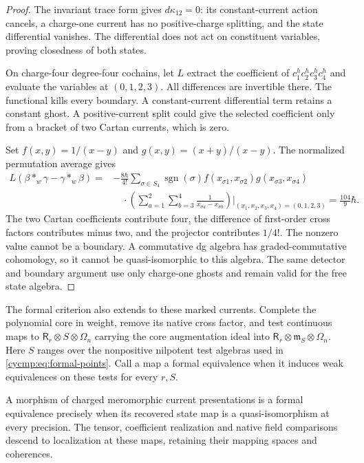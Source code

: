 \begin{proof}
The invariant trace form gives $d\kappa_{12}=0$: its
constant-current action cancels, a charge-one current has no
positive-charge splitting, and the state differential vanishes.
The differential does not act on constituent variables, proving
closedness of both states.

On charge-four degree-four cochains, let $L$ extract the coefficient
of $c_1^hc_2^hc_3^hc_4^h$ and evaluate the variables at $(0,1,2,3)$.
All differences are invertible there. The functional kills every
boundary. A constant-current differential term retains a constant
ghost. A positive-current split could give the selected coefficient
only from a bracket of two Cartan currents, which is zero.

Set $f(x,y)=1/(x-y)$ and $g(x,y)=(x+y)/(x-y)$. The normalized
permutation average gives
\begin{equation}\label{cycmp:eq:cohomology-detector}
 \begin{split}
 L(\beta*_w\gamma-\gamma*_w\beta)
 ={}&-\frac{8\hbar}{4!}\sum_{\sigma\in S_4}\operatorname{sgn}(\sigma)
 f(x_{\sigma1},x_{\sigma2})g(x_{\sigma3},x_{\sigma4})\\
 &\quad\cdot\left(\sum_{a=1}^2\sum_{b=3}^4
              \frac1{x_{\sigma a}-x_{\sigma b}}\right)
          \bigg|_{(x_1,x_2,x_3,x_4)=(0,1,2,3)}
 =\frac{104}{9}\hbar.
 \end{split}
\end{equation}
The two Cartan coefficients contribute four, the difference of
first-order cross factors contributes minus two, and the projector
contributes $1/4!$. The nonzero value cannot be a boundary.
A commutative dg algebra has graded-commutative cohomology, so it
cannot be quasi-isomorphic to this algebra. The same detector and
boundary argument use only charge-one ghosts and remain valid for
the free state algebra.
\end{proof}

The formal criterion also extends to these marked currents. Complete
the polynomial core in weight, remove its native cross factor, and
test continuous maps to
$\mathsf R_r\otimes S\otimes\Omega_n$ carrying the core augmentation
ideal into $\mathsf R_r\otimes\mathfrak m_S\otimes\Omega_n$.
Here $S$ ranges over the nonpositive nilpotent test algebras used
in \eqref{cycmp:eq:formal-points}. Call a map a formal equivalence
when it induces weak equivalences on these tests for every $r,S$.

\begin{corollary}\label{cycmp:cor:interacting-formal}
A morphism of charged meromorphic current presentations is a formal
equivalence precisely when its recovered state map is a
quasi-isomorphism at every precision. The tensor, coefficient
realization and native field comparisons descend to localization
at these maps, retaining their mapping spaces and coherences.
\end{corollary}

